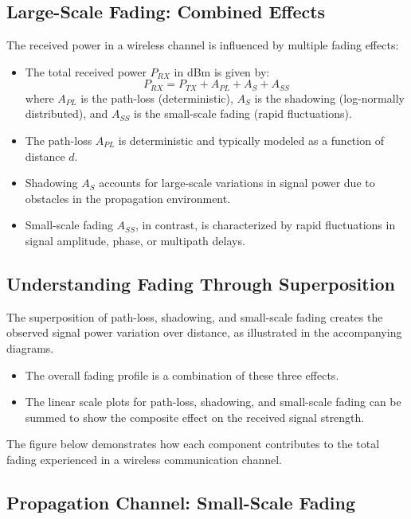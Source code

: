 \subsection*{Large-Scale Fading: Combined Effects}

The received power in a wireless channel is influenced by multiple fading effects:

\begin{itemize}
    \item The total received power \( P_{RX} \) in dBm is given by:
    \[
    P_{RX} = P_{TX} + A_{PL} + A_{S} + A_{SS}
    \]
    where \( A_{PL} \) is the path-loss (deterministic), \( A_{S} \) is the shadowing (log-normally distributed), and \( A_{SS} \) is the small-scale fading (rapid fluctuations).

    \item The path-loss \( A_{PL} \) is deterministic and typically modeled as a function of distance \( d \).

    \item Shadowing \( A_{S} \) accounts for large-scale variations in signal power due to obstacles in the propagation environment.

    \item Small-scale fading \( A_{SS} \), in contrast, is characterized by rapid fluctuations in signal amplitude, phase, or multipath delays.
\end{itemize}
\subsection*{Understanding Fading Through Superposition}

The superposition of path-loss, shadowing, and small-scale fading creates the observed signal power variation over distance, as illustrated in the accompanying diagrams.

\begin{itemize}
    \item The overall fading profile is a combination of these three effects.
    \item The linear scale plots for path-loss, shadowing, and small-scale fading can be summed to show the composite effect on the received signal strength.
\end{itemize}

The figure below demonstrates how each component contributes to the total fading experienced in a wireless communication channel.


\subsection*{Propagation Channel: Small-Scale Fading}

